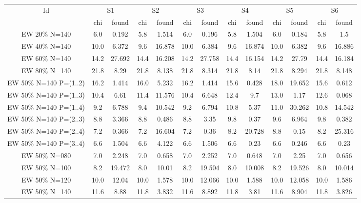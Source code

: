 \documentclass[landscape, 12pt]{report}
\begin{document}
	\begin{tabular}{|c|cc|cc|cc|cc|cc|cc|}
	\hline
	\multicolumn{1}{|c|}{Id} & \multicolumn{2}{|c|}{S1} & \multicolumn{2}{|c|}{S2} & \multicolumn{2}{|c|}{S3} & \multicolumn{2}{|c|}{S4} & \multicolumn{2}{|c|}{S5} & \multicolumn{2}{|c|}{S6}
	\\
	 & chi & found & chi & found & chi & found & chi & found & chi & found & chi & found
	\\
	\hline
	EW 20\% N=140 &  6.0 & 0.192 &  5.8 & 1.514 &  6.0 & 0.196 &  5.8 & 1.504 &  6.0 & 0.184 &  5.8 &  1.5
	\\
	EW 40\% N=140 & 10.0 & 6.372 &  9.6 & 16.878 & 10.0 & 6.384 &  9.6 & 16.874 & 10.0 & 6.382 &  9.6 & 16.886
	\\
	EW 60\% N=140 & 14.2 & 27.692 & 14.4 & 16.208 & 14.2 & 27.758 & 14.4 & 16.154 & 14.2 & 27.79 & 14.4 & 16.184
	\\
	EW 80\% N=140 & 21.8 & 8.29 & 21.8 & 8.138 & 21.8 & 8.314 & 21.8 & 8.14 & 21.8 & 8.294 & 21.8 & 8.148
	\\
	\hline
	EW 50\% N=140 P=(1..2) & 16.2 & 1.414 & 16.0 & 5.232 & 16.2 & 1.414 & 15.6 & 0.428 & 18.0 & 19.652 & 15.6 & 0.612
	\\
	EW 50\% N=140 P=(1..3) & 10.4 & 6.61 & 11.4 & 11.576 & 10.4 & 6.648 & 12.4 &  9.7 & 13.0 & 1.17 & 12.6 & 0.068
	\\
	EW 50\% N=140 P=(1..4) &  9.2 & 6.788 &  9.4 & 10.542 &  9.2 & 6.794 & 10.8 & 5.37 & 11.0 & 30.262 & 10.8 & 14.542
	\\
	EW 50\% N=140 P=(2..3) &  8.8 & 3.366 &  8.8 & 0.486 &  8.8 & 3.35 &  9.8 & 0.37 &  9.6 & 6.964 &  9.8 & 0.382
	\\
	EW 50\% N=140 P=(2..4) &  7.2 & 0.366 &  7.2 & 16.604 &  7.2 & 0.36 &  8.2 & 20.728 &  8.8 & 0.15 &  8.2 & 25.316
	\\
	EW 50\% N=140 P=(3..4) &  6.6 & 1.504 &  6.6 & 4.122 &  6.6 & 1.506 &  6.6 & 0.23 &  6.6 & 0.246 &  6.6 & 0.23
	\\
	\hline
	EW 50\% N=080 &  7.0 & 2.248 &  7.0 & 0.658 &  7.0 & 2.252 &  7.0 & 0.648 &  7.0 & 2.25 &  7.0 & 0.656
	\\
	EW 50\% N=100 &  8.2 & 19.472 &  8.0 & 10.01 &  8.2 & 19.504 &  8.0 & 10.008 &  8.2 & 19.526 &  8.0 & 10.014
	\\
	EW 50\% N=120 & 10.0 & 12.04 & 10.0 & 1.578 & 10.0 & 12.066 & 10.0 & 1.588 & 10.0 & 12.058 & 10.0 & 1.586
	\\
	EW 50\% N=140 & 11.6 & 8.88 & 11.8 & 3.832 & 11.6 & 8.892 & 11.8 & 3.81 & 11.6 & 8.904 & 11.8 & 3.826
	\\

\end{tabular}
\end{document}
